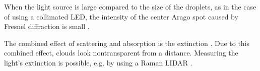 When the light source is large compared to the size of the droplets, as in the case of using a collimated LED, the intensity of the center Arago spot caused by Fresnel diffraction is small \cite{reis2017}.

The combined effect of scattering and absorption is the extinction \cite{bohr2008}. Due to this combined effect, clouds look nontransparent from a distance. Measuring the light's extinction is possible, e.g. by using a Raman LIDAR \cite{ans1990}.


